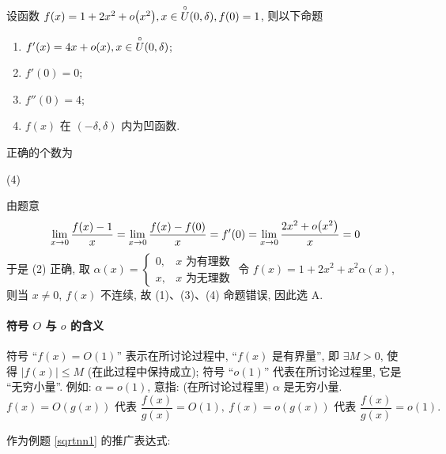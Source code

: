 \begin{example}
    设函数 $f(x)=1+2x^2+o\qty(x^2),x\in \overset{\circ}{U}(0,\delta), f(0)=1$, 则以下命题
    \begin{enumerate}[label=(\arabic{*})]
        \item $f'(x)=4x+o\qty(x),x\in \overset{\circ}{U}(0,\delta)$;
        \item $f'(0)=0$;
        \item $f''(0)=4$;
        \item $f(x)$ 在 $(-\delta, \delta)$ 内为凹函数.
    \end{enumerate}
    正确的个数为
    \begin{tasks}(4)
    \end{tasks}
\end{example}
\begin{solution}
    由题意 $$
        \lim_{x \to 0}\dfrac{f(x)-1}{x}=\lim_{x \to 0}\dfrac{f(x)-f(0)}{x}=f'(0)=\lim_{x \to 0}\dfrac{2x^2+o\qty(x^2)}{x}=0
    $$
    于是 (2) 正确, 取 $\alpha(x)=\begin{cases}
            0, & x \text{ 为有理数} \\
            x, & x \text{ 为无理数}
        \end{cases}$
    令 $
        f(x)=1+2x^2+x^2\alpha(x)
    $, 则当 $x\neq 0$, $f(x)$ 不连续, 故 (1)、(3)、(4) 命题错误, 因此选 A.
\end{solution}

\paragraph{符号 $O$ 与 $o$ 的含义}
符号 “$f(x)=O(1)$” 表示在所讨论过程中, “$f(x) $ 是有界量”, 即 $ \exists M>0$, 使得 $ |f(x)| \leqslant M $ (在此过程中保持成立);
符号 “$o(1)$” 代表在所讨论过程里, 它是 “无穷小量”. 例如: $ \alpha=o(1) $, 意指: (在所讨论过程里) $\alpha $ 是无穷小量.
$$f(x)=O(g(x)) \text{ 代表 } \dfrac{f(x)}{g(x)}=O(1),~f(x)=o(g(x))\text{ 代表 }\dfrac{f(x)}{g(x)}=o(1).$$

\begin{inference}[Laurent  级数]\label{inference:Laurent jishu}
    作为例题 \ref{sqrtnn1} 的推广表达式:
\end{inference}


